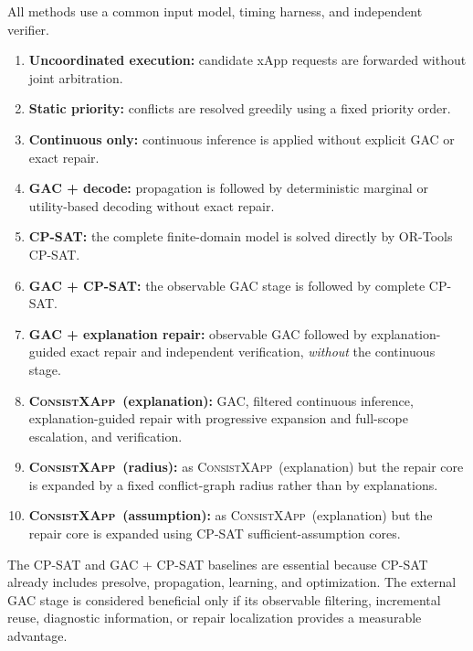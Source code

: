 \documentclass[pdflatex,sn-mathphys-num,iicol,oneside]{sn-jnl}
\newcommand{\method}{\textsc{ConsistXApp}}
\begin{document}
All methods use a common input model, timing harness, and independent
verifier.

\begin{enumerate}

    \item \textbf{Uncoordinated execution:}
    candidate xApp requests are forwarded without joint arbitration.

    \item \textbf{Static priority:}
    conflicts are resolved greedily using a fixed priority order.

    \item \textbf{Continuous only:}
    continuous inference is applied without explicit GAC or exact
    repair.

    \item \textbf{GAC + decode:}
    propagation is followed by deterministic marginal or
    utility-based decoding without exact repair.

    \item \textbf{CP-SAT:}
    the complete finite-domain model is solved directly by OR-Tools
    CP-SAT.

    \item \textbf{GAC + CP-SAT:}
    the observable GAC stage is followed by complete CP-SAT.

    \item \textbf{GAC + explanation repair:}
    observable GAC followed by explanation-guided exact repair and
    independent verification, \emph{without} the continuous stage.

    \item \textbf{\method\ (explanation):}
    GAC, filtered continuous inference, explanation-guided repair with
    progressive expansion and full-scope escalation, and verification.

    \item \textbf{\method\ (radius):}
    as \method\ (explanation) but the repair core is expanded by a
    fixed conflict-graph radius rather than by explanations.

    \item \textbf{\method\ (assumption):}
    as \method\ (explanation) but the repair core is expanded using
    CP-SAT sufficient-assumption cores.

\end{enumerate}

The CP-SAT and GAC + CP-SAT baselines are essential because CP-SAT
already includes presolve, propagation, learning, and optimization.
The external GAC stage is considered beneficial only if its observable
filtering, incremental reuse, diagnostic information, or repair
localization provides a measurable advantage.
\end{document}
